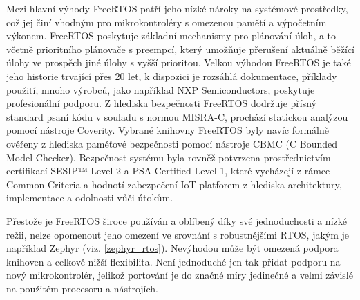 Mezi hlavní výhody FreeRTOS patří jeho nízké nároky na systémové prostředky, což jej činí vhodným pro mikrokontroléry s omezenou pamětí a výpočetním výkonem. FreeRTOS poskytuje základní mechanismy pro plánování úloh, a to včetně prioritního plánovače s preempcí, který umožňuje přerušení aktuálně běžící úlohy ve prospěch jiné úlohy s vyšší prioritou. Velkou výhodou FreeRTOS je také jeho historie trvající přes 20 let, k dispozici je rozsáhlá dokumentace, příklady použití, mnoho výrobců, jako například NXP Semiconductors, poskytuje profesionální podporu. Z hlediska bezpečnosti FreeRTOS dodržuje přísný standard psaní kódu v souladu s normou MISRA-C, prochází statickou analýzou pomocí nástroje Coverity. Vybrané knihovny FreeRTOS byly navíc formálně ověřeny z hlediska paměťové bezpečnosti pomocí nástroje CBMC (C Bounded Model Checker). Bezpečnost systému byla rovněž potvrzena prostřednictvím certifikací SESIP™ Level 2 a PSA Certified Level 1, které vycházejí z rámce Common Criteria a hodnotí zabezpečení IoT platforem z hlediska architektury, implementace a odolnosti vůči útokům. \cite{freertos_security}

Přestože je FreeRTOS široce používán a oblíbený díky své jednoduchosti a nízké režii, nelze opomenout jeho omezení ve srovnání s robustnějšími RTOS, jakým je například Zephyr (viz. \ref{zephyr_rtos}). Nevýhodou může být omezená podpora knihoven a celkově nižší flexibilita. Není jednoduché jen tak přidat podporu na nový mikrokontrolér, jelikož portování je do značné míry jedinečné a velmi závislé na použitém procesoru a nástrojích. \cite{freertos_portability, freertos_vs_zephyr}


